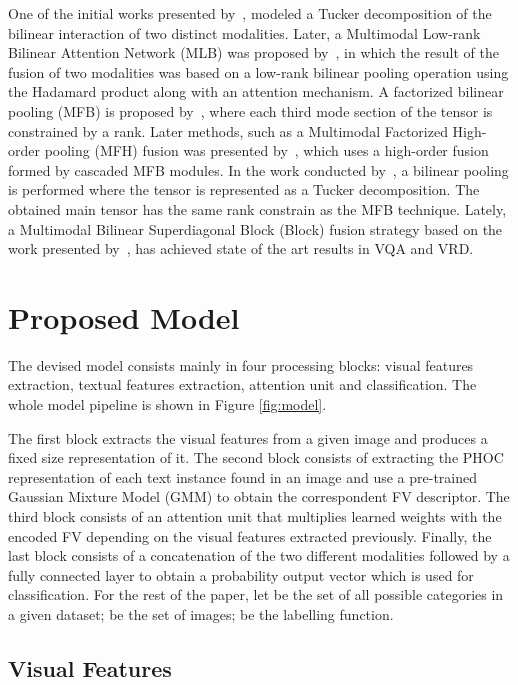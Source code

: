 \documentclass[10pt,twocolumn,letterpaper]{article}
\begin{document}
One of the initial works presented by~\cite{ben2017mutan}, modeled a Tucker decomposition of the bilinear interaction of two distinct modalities. Later, a Multimodal Low-rank Bilinear Attention Network (MLB) was proposed by~\cite{kim2016hadamard}, in which the result of the fusion of two modalities was based on a low-rank bilinear pooling operation using the Hadamard product along with an attention mechanism. 
A factorized bilinear pooling (MFB) is proposed by~\cite{yu2017multi}, where each third mode section of the tensor is constrained by a rank. Later methods, such as a Multimodal Factorized High-order pooling (MFH) fusion was presented by~\cite{yu2018beyond}, which uses a high-order fusion formed by cascaded MFB modules. In the work conducted by~\cite{ben2017mutan}, a bilinear pooling is performed where the tensor is represented as a Tucker decomposition. The obtained main tensor has the same rank constrain as the MFB technique.  Lately, a Multimodal Bilinear Superdiagonal Block (Block) fusion strategy based on the work presented by~\cite{ben2019block}, has achieved state of the art results in VQA and VRD. 

\section{Proposed Model}
\label{sec:Proposed_Model}


The devised model consists mainly in four processing blocks: visual features extraction, textual features extraction, attention unit and classification. The whole model pipeline is shown in Figure \ref{fig:model}.

The first block extracts the visual features from a given image and produces a fixed size representation of it. The second block consists of extracting the PHOC representation of each text instance found in an image and use a pre-trained Gaussian Mixture Model (GMM) to obtain the correspondent FV descriptor. The third block consists of an attention unit that multiplies learned weights with the encoded FV depending on the visual features extracted previously. Finally, the last block consists of a concatenation of the two different modalities followed by a fully connected layer to obtain a probability output vector which is used for classification. For the rest of the paper, let  be the set of all possible categories in a given dataset;  be the set of images;  be the labelling function.
\subsection{Visual Features}
\end{document}
